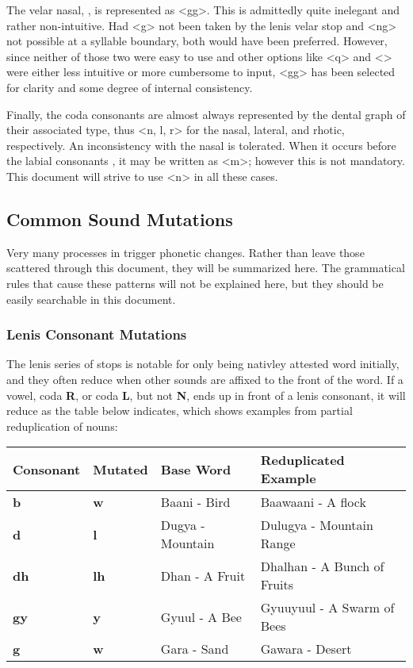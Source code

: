   The velar nasal, \phonemic{\engma}, is represented as <gg>. This is admittedly quite inelegant and rather non-intuitive. Had <g> not been taken by the lenis velar stop and <ng> not possible at a syllable boundary, both would have been preferred. However, since neither of those two were easy to use and other options like <q> and <> were either less intuitive or more cumbersome to input, <gg> has been selected for clarity and some degree of internal consistency.\par
  Finally, the coda consonants are almost always represented by the dental graph of their associated type, thus <n, l, r> for the nasal, lateral, and rhotic, respectively. An inconsistency with the nasal is tolerated. When it occurs before the labial consonants , it may be written as <m>; however this is not mandatory. This document will strive to use <n> in all these cases.\par

  \subsection{Common Sound Mutations}
  Very many processes in \langname trigger phonetic changes. Rather than leave those scattered through this document, they will be summarized here. The grammatical rules that cause these patterns will not be explained here, but they should be easily searchable in this document.

  \subsubsection{Lenis Consonant Mutations}
  The lenis series of stops is notable for only being nativley attested word initially, and they often reduce when other sounds are affixed to the front of the word. If a vowel, coda \textbf{R}, or coda \textbf{L}, but not \textbf{N}, ends up in front of a lenis consonant, it will reduce as the table below indicates, which shows examples from partial reduplication of nouns:

  \vertspace
  \begin{tabular}{|l|l|l|l|}
    \hline
    Consonant   & Mutated     & Base Word        & Reduplicated Example         \\ \hline \hline
    \textbf{b}  & \textbf{w}  & Baani - Bird     & Baawaani - A flock           \\
    \textbf{d}  & \textbf{l}  & Dugya - Mountain & Dulugya  - Mountain Range    \\
    \textbf{dh} & \textbf{lh} & Dhan  - A Fruit  & Dhalhan   - A Bunch of Fruits \\
    \textbf{gy} & \textbf{y}  & Gyuul - A Bee    & Gyuuyuul - A Swarm of Bees   \\
    \textbf{g}  & \textbf{w}  & Gara  - Sand     & Gawara   - Desert            \\ \hline
  \end{tabular}

